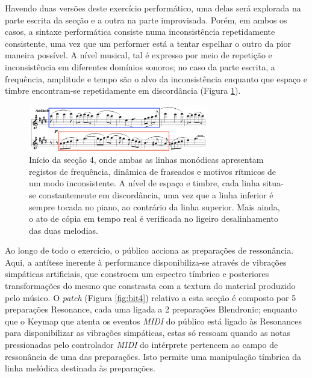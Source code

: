 \documentclass[../main.tex]{subfiles}
\begin{document}
Havendo duas versões deste exercício performático, uma delas será explorada na parte escrita da secção e a outra na parte improvisada. Porém, em ambos os casos, a sintaxe performática consiste numa inconsistência repetidamente consistente, uma vez que um performer está a tentar espelhar o outro da pior maneira possível. A nível musical, tal é expresso por meio de repetição e inconsistência em diferentes domínios sonoros; no caso da parte escrita, a frequência, amplitude e tempo são o alvo da inconsistência enquanto que espaço e timbre encontram-se repetidamente em discordância (Figura \ref{fig:obra4}).

\begin{figure}[h]
    \centering
    \captionsetup{width=0.8\textwidth}
    \includegraphics[width=0.7\textwidth]{images/obra4.png}
    \caption{Início da secção 4, onde ambas as linhas monódicas apresentam registos de frequência, dinâmica de fraseados e motivos rítmicos de um modo inconsistente. A nível de espaço e timbre, cada linha situa-se constantemente em discordância, uma vez que a linha inferior é sempre tocada no piano, ao contrário da linha superior. Mais ainda, o ato de cópia em tempo real é verificada no ligeiro desalinhamento das duas melodias.}
    \label{fig:obra4}
\end{figure}

Ao longo de todo o exercício, o público acciona as preparações de ressonância. Aqui, a antítese inerente à performance disponibiliza-se através de vibrações simpáticas artificiais, que constroem um espectro tímbrico e posteriores transformações do mesmo que constrasta com a textura do material produzido pelo músico.
O \textsl{patch} (Figura \ref{fig:bit4}) relativo a esta secção é composto por 5 preparações Resonance, cada uma ligada a 2 preparações Blendronic; enquanto que o Keymap que atenta os eventos \textsl{MIDI} do público está ligado às Resonances para disponibilizar as vibrações simpáticas, estas só ressoam quando as notas pressionadas pelo controlador \textsl{MIDI} do intérprete pertencem ao campo de ressonância de uma das preparações. Isto permite uma manipulação tímbrica da linha melódica destinada às preparações.
\end{document}
